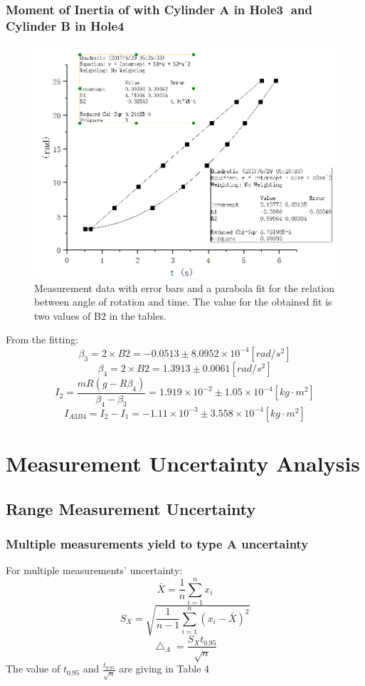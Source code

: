 \documentclass[12pt]{article}
\begin{document}
\subsubsection{Moment of Inertia of with Cylinder A in Hole\textcircled{3} and Cylinder B in Hole\textcircled{4}}
\begin{figure}[H]
\centering
\includegraphics[width=1\linewidth]{P5.jpg}
\caption{Measurement data with error bars and a parabola fit for the relation between angle of rotation and time. The value for the obtained fit is two values of B2 in the tables.}
\end{figure}
From the fitting:
$$\beta_3=2\times{B2}=-0.0513\pm8.0952\times10^{-4}[rad/s^2]$$
$$\beta_4=2\times{B2}=1.3913\pm0.0061[rad/s^2]$$
$$I_2=\frac{mR(g-R\beta_4)}{\beta_4-\beta_3}=1.919\times10^{-2}\pm1.05\times10^{-4}[kg\cdot{m^2}]$$
$$I_{A3B4}=I_2-I_1=-1.11\times10^{-3}\pm3.558\times10^{-4}[kg\cdot{m^2}]$$

\section{Measurement Uncertainty Analysis}
\subsection{Range Measurement Uncertainty}
\subsubsection{Multiple measurements yield to type A uncertainty}
For multiple measurements' uncertainty:
$$\bar{X}=\frac{1}{n}\sum_{i=1}^nx_i$$
$$S_X=\sqrt{\frac{1}{n-1}\sum_{i=1}^n(x_i-\bar{X})^2}$$  
$$\bigtriangleup_A=\frac{S_Xt_{0.95}}{\sqrt{n}}$$
The value of $t_0.95$ and $\frac{t_{0.95}}{\sqrt{n}}$ are giving in Table 4 
\end{document}
